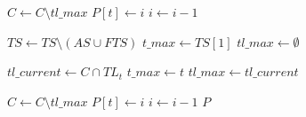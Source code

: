 \begin{algorithm}[htbp!]
\begin{algorithmic}[1]
			\State $C \gets C \setminus tl\_max$
			\State $P[t] \gets i$
			\State $i \gets i - 1$
		\EndWhile
		
		\State $TS \gets TS \setminus (AS \cup FTS)$
			\State $t\_max \gets TS[1]$ 
			\State $tl\_max \gets \emptyset$
			
				\State $tl\_current \gets C \cap TL_{t}$
					\State $t\_max \gets t$
					\State $tl\_max \gets tl\_current$
				\EndIf
			\EndFor
			
			\State $C \gets C \setminus tl\_max$
			\State $P[t] \gets i$
			\State $i \gets i - 1$
		\EndWhile
		\State \Return $P$
	\EndProcedure	
\end{algorithmic}
\end{algorithm}